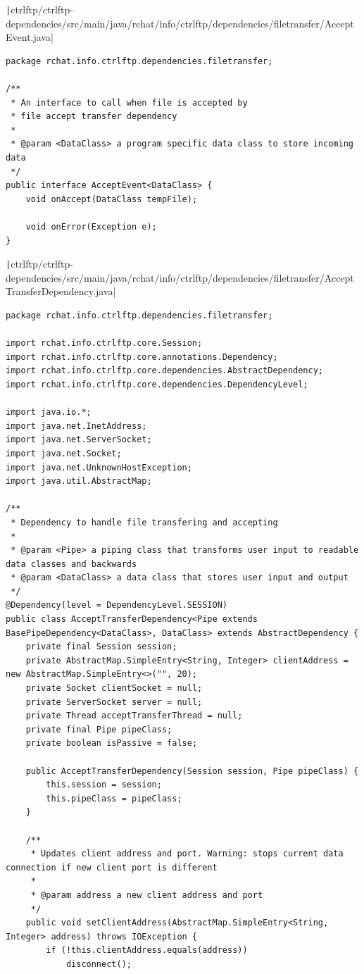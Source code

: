 \documentclass[a4paper,14pt]{extarticle}
\begin{document}
\texttt|ctrlftp/ctrlftp-dependencies/src/main/java/rchat/info/ctrlftp/dependencies/filetransfer/AcceptEvent.java|
\begin{verbatim}
package rchat.info.ctrlftp.dependencies.filetransfer;

/**
 * An interface to call when file is accepted by
 * file accept transfer dependency
 *
 * @param <DataClass> a program specific data class to store incoming data
 */
public interface AcceptEvent<DataClass> {
    void onAccept(DataClass tempFile);

    void onError(Exception e);
}
\end{verbatim}
\texttt|ctrlftp/ctrlftp-dependencies/src/main/java/rchat/info/ctrlftp/dependencies/filetransfer/AcceptTransferDependency.java|
\begin{verbatim}
package rchat.info.ctrlftp.dependencies.filetransfer;

import rchat.info.ctrlftp.core.Session;
import rchat.info.ctrlftp.core.annotations.Dependency;
import rchat.info.ctrlftp.core.dependencies.AbstractDependency;
import rchat.info.ctrlftp.core.dependencies.DependencyLevel;

import java.io.*;
import java.net.InetAddress;
import java.net.ServerSocket;
import java.net.Socket;
import java.net.UnknownHostException;
import java.util.AbstractMap;

/**
 * Dependency to handle file transfering and accepting
 *
 * @param <Pipe> a piping class that transforms user input to readable data classes and backwards
 * @param <DataClass> a data class that stores user input and output
 */
@Dependency(level = DependencyLevel.SESSION)
public class AcceptTransferDependency<Pipe extends BasePipeDependency<DataClass>, DataClass> extends AbstractDependency {
    private final Session session;
    private AbstractMap.SimpleEntry<String, Integer> clientAddress = new AbstractMap.SimpleEntry<>("", 20);
    private Socket clientSocket = null;
    private ServerSocket server = null;
    private Thread acceptTransferThread = null;
    private final Pipe pipeClass;
    private boolean isPassive = false;

    public AcceptTransferDependency(Session session, Pipe pipeClass) {
        this.session = session;
        this.pipeClass = pipeClass;
    }

    /**
     * Updates client address and port. Warning: stops current data connection if new client port is different
     *
     * @param address a new client address and port
     */
    public void setClientAddress(AbstractMap.SimpleEntry<String, Integer> address) throws IOException {
        if (!this.clientAddress.equals(address))
            disconnect();


\end{verbatim}
\end{document}

